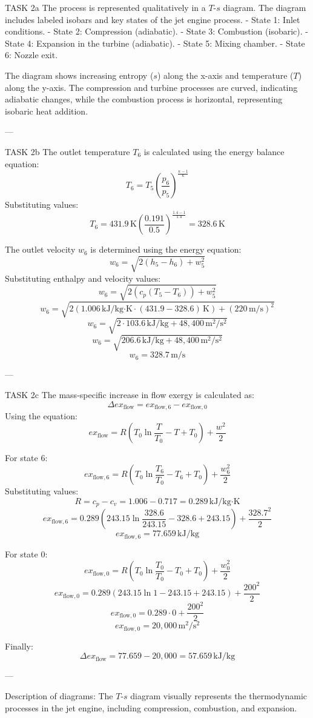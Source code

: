 TASK 2a  
The process is represented qualitatively in a \( T \)-\( s \) diagram. The diagram includes labeled isobars and key states of the jet engine process.  
- State 1: Inlet conditions.  
- State 2: Compression (adiabatic).  
- State 3: Combustion (isobaric).  
- State 4: Expansion in the turbine (adiabatic).  
- State 5: Mixing chamber.  
- State 6: Nozzle exit.  

The diagram shows increasing entropy (\( s \)) along the x-axis and temperature (\( T \)) along the y-axis. The compression and turbine processes are curved, indicating adiabatic changes, while the combustion process is horizontal, representing isobaric heat addition.  

---

TASK 2b  
The outlet temperature \( T_6 \) is calculated using the energy balance equation:  
\[
T_6 = T_5 \left( \frac{p_6}{p_5} \right)^{\frac{\kappa - 1}{\kappa}}
\]  
Substituting values:  
\[
T_6 = 431.9 \, \text{K} \left( \frac{0.191}{0.5} \right)^{\frac{1.4 - 1}{1.4}} = 328.6 \, \text{K}
\]  

The outlet velocity \( w_6 \) is determined using the energy equation:  
\[
w_6 = \sqrt{2 \left( h_5 - h_6 \right) + w_5^2}
\]  
Substituting enthalpy and velocity values:  
\[
w_6 = \sqrt{2 \left( c_p \left( T_5 - T_6 \right) \right) + w_5^2}
\]  
\[
w_6 = \sqrt{2 \left( 1.006 \, \text{kJ/kg·K} \cdot (431.9 - 328.6) \, \text{K} \right) + (220 \, \text{m/s})^2}
\]  
\[
w_6 = \sqrt{2 \cdot 103.6 \, \text{kJ/kg} + 48,400 \, \text{m}^2/\text{s}^2}
\]  
\[
w_6 = \sqrt{206.6 \, \text{kJ/kg} + 48,400 \, \text{m}^2/\text{s}^2}
\]  
\[
w_6 = 328.7 \, \text{m/s}
\]  

---

TASK 2c  
The mass-specific increase in flow exergy is calculated as:  
\[
\Delta ex_{\text{flow}} = ex_{\text{flow},6} - ex_{\text{flow},0}
\]  
Using the equation:  
\[
ex_{\text{flow}} = R \left( T_0 \ln \frac{T}{T_0} - T + T_0 \right) + \frac{w^2}{2}
\]  

For state 6:  
\[
ex_{\text{flow},6} = R \left( T_0 \ln \frac{T_6}{T_0} - T_6 + T_0 \right) + \frac{w_6^2}{2}
\]  
Substituting values:  
\[
R = c_p - c_v = 1.006 - 0.717 = 0.289 \, \text{kJ/kg·K}
\]  
\[
ex_{\text{flow},6} = 0.289 \left( 243.15 \ln \frac{328.6}{243.15} - 328.6 + 243.15 \right) + \frac{328.7^2}{2}
\]  
\[
ex_{\text{flow},6} = 77.659 \, \text{kJ/kg}
\]  

For state 0:  
\[
ex_{\text{flow},0} = R \left( T_0 \ln \frac{T_0}{T_0} - T_0 + T_0 \right) + \frac{w_0^2}{2}
\]  
\[
ex_{\text{flow},0} = 0.289 \left( 243.15 \ln 1 - 243.15 + 243.15 \right) + \frac{200^2}{2}
\]  
\[
ex_{\text{flow},0} = 0.289 \cdot 0 + \frac{200^2}{2}
\]  
\[
ex_{\text{flow},0} = 20,000 \, \text{m}^2/\text{s}^2
\]  

Finally:  
\[
\Delta ex_{\text{flow}} = 77.659 - 20,000 = 57.659 \, \text{kJ/kg}
\]  

---

Description of diagrams:  
The \( T \)-\( s \) diagram visually represents the thermodynamic processes in the jet engine, including compression, combustion, and expansion.
